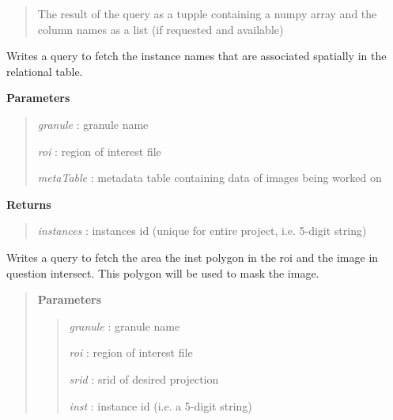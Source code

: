 \documentclass[letterpaper,10pt,openany,oneside]{sphinxmanual}
\begin{document}
\begin{fulllineitems}
\begin{fulllineitems}
\begin{quote}
The result of the query as a tupple containing a numpy array and the column names as a list (if requested and available)
\end{quote}

\end{fulllineitems}


\begin{fulllineitems}
\label{code:Database.Database.qryGetInstances}
Writes a query to fetch the instance names that are
associated spatially in the relational table.

\textbf{Parameters}
\begin{quote}

\emph{granule}    : granule name

\emph{roi}        : region of interest file

\emph{metaTable}  : metadata table containing data of images being worked on
\end{quote}

\textbf{Returns}
\begin{quote}

\emph{instances}  : instances id (unique for entire project, i.e. 5-digit string)
\end{quote}

\end{fulllineitems}


\begin{fulllineitems}
\label{code:Database.Database.qryMaskZone}
Writes a query to fetch the area the inst polygon in the roi and the image in question intersect. 
This polygon will be used to mask the image.
\begin{quote}

\textbf{Parameters}
\begin{quote}

\emph{granule}    : granule name

\emph{roi}        : region of interest file

\emph{srid}       : srid of desired projection

\emph{inst}       : instance id (i.e. a 5-digit string)


\end{quote}
\end{quote}
\end{fulllineitems}
\end{fulllineitems}
\end{document}
